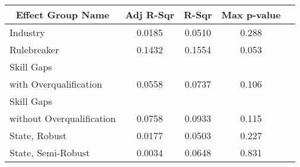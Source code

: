 {
\def\sym#1{\ifmmode^{#1}\else\(^{#1}\)\fi}
\begin{tabular}{l*{4}{c}}
    \toprule
    \multicolumn{1}{c}{Effect Group Name} & \multicolumn{1}{c}{Adj R-Sqr} & \multicolumn{1}{c}{R-Sqr} & \multicolumn{1}{c}{Max p-value} \\
    \midrule
    Industry                              & 0.0185                        & 0.0510                    & 0.288                           \\
    \addlinespace
    Rulebreaker                           & 0.1432                        & 0.1554                    & 0.053                           \\
    \addlinespace
    Skill Gaps                            &                               &                           &                                 \\
    with Overqualification                & 0.0558                        & 0.0737                    & 0.106                           \\
    \addlinespace
    Skill Gaps                            &                               &                           &                                 \\
    without Overqualification             & 0.0758                        & 0.0933                    & 0.115                           \\
    \addlinespace
    State, Robust                         & 0.0177                        & 0.0503                    & 0.227                           \\
    \addlinespace
    State, Semi-Robust                    & 0.0034                        & 0.0648                    & 0.831                           \\
    \bottomrule
\end{tabular}
}
